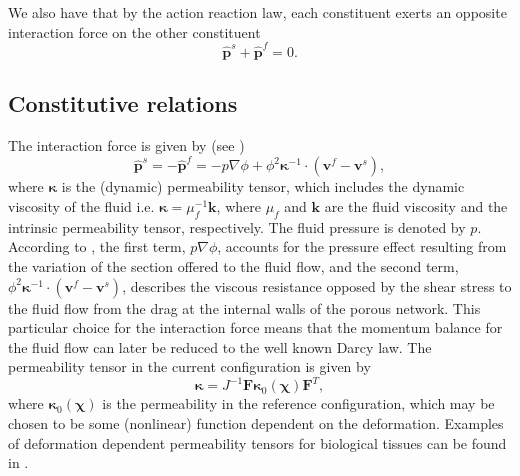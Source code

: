 We also have that by the action reaction law, each constituent exerts an opposite interaction force on the other constituent 
\begin{equation}
 \hat{\boldsymbol{p}}^{s}+\hat{\boldsymbol{p}}^{f}=0.
\end{equation}

\subsection{Constitutive relations}
\label{sec:constitutive}
The interaction force is given by (see \citet[eqn. (3.49)]{coussy2004poromechanics})
\begin{equation}
 \hat{\boldsymbol{p}}^{s}=-\hat{\boldsymbol{p}}^{f}=-p\nabla \phi + \phi^{2} \boldsymbol{\kappa}^{-1}\cdot(\boldsymbol{v}^{f}-\boldsymbol{v}^{s}),
\end{equation}
where $\boldsymbol{\kappa}$ is the (dynamic) permeability tensor, which includes the dynamic viscosity of the fluid i.e. $\boldsymbol{\kappa}=\mu_{f}^{-1}\boldsymbol{k}$, where $\mu_{f}$ and $\boldsymbol{k}$ are the fluid viscosity and the intrinsic permeability tensor, respectively. The fluid pressure is denoted by $p$. According to \citet{coussy2004poromechanics}, the first term,  $p  \nabla \phi$, accounts for the pressure effect resulting from the variation of the section offered to the fluid flow, and the second term,  $\phi^{2} \boldsymbol{\kappa}^{-1}\cdot(\boldsymbol{v}^{f}-\boldsymbol{v}^{s})$, describes the viscous resistance opposed by the shear stress to the fluid flow from the drag at the internal walls of the porous network. This particular choice for the interaction force means that the momentum balance for the fluid flow can later be reduced to the well known Darcy law. The permeability tensor in the current configuration is given by 
\begin{equation}
 \boldsymbol{\kappa}=J^{-1} \boldsymbol{F} \boldsymbol{\kappa}_{0}(\boldsymbol{\chi}) \boldsymbol{F}^{T} ,
 \label{eqn:permeability_const}
\end{equation}
where $\boldsymbol{\kappa}_{0}(\boldsymbol{\chi}) $ is the permeability in the reference configuration, which may be chosen to be some (nonlinear) function dependent on the deformation. Examples of deformation dependent permeability tensors for biological tissues can be found in \citep{kowalczyk1994modelling,holmes1990nonlinear,lai1980drag}.
